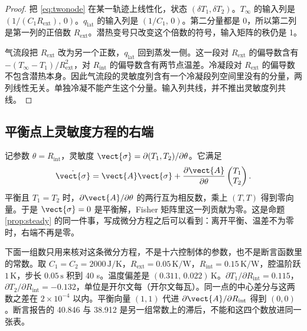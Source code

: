 \begin{proof}
把 \eqref{eq:twonode} 在某一轨迹上线性化，状态 \((\delta T_1,\delta T_2)\)。\(T_\infty\) 的输入列是 \((1/(C_1 R_{\mathrm{ext}}),\,0)\)。\(q_{\mathrm{lat}}\) 的输入列是 \((1/C_1,\,0)\)。第二分量都是 0，所以第二列是第一列的正倍数 \(R_{\mathrm{ext}}\)。潜热变号只改变这个倍数的符号，输入矩阵的秩仍是 1。

气流段把 \(R_{\mathrm{ext}}\) 改为另一个正数，\(q_{\mathrm{lat}}\) 回到蒸发一侧。这一段对 \(R_{\mathrm{ext}}\) 的偏导数含有 \(-(T_\infty-T_1)/R_{\mathrm{ext}}^2\)，对 \(R_{\mathrm{int}}\) 的偏导数含有两节点温差。冷凝段对 \(R_{\mathrm{ext}}\) 的偏导数不包含潜热本身。因此气流段的灵敏度列含有一个冷凝段列空间里没有的分量，两列线性无关。单独冷凝不能产生这个分量。输入列共线，并不推出灵敏度列共线。
\end{proof}

\subsection{平衡点上灵敏度方程的右端}

记参数 \(\theta=R_{\mathrm{int}}\)，灵敏度 \(\vect{\sigma}=\partial(T_1,T_2)/\partial\theta\)。它满足
\begin{equation}
\label{eq:sigma}
\dot{\vect{\sigma}}=\vect{A}\vect{\sigma}+\frac{\partial\vect{A}}{\partial\theta}\begin{pmatrix}T_1\\ T_2\end{pmatrix}.
\end{equation}
平衡且 \(T_1=T_2\) 时，\(\partial\vect{A}/\partial\theta\) 的两行互为相反数，乘上 \((T,T)\) 得到零向量。于是 \(\vect{\sigma}=0\) 是平衡解，Fisher 矩阵里这一列贡献为零。这是命题 \ref{prop:steady} 的同一件事，写成微分方程之后可以看到：离开平衡、温差不为零时，右端不再是零。

下面一组数只用来核对这条微分方程，不是十六控制体的参数，也不是断言函数里的常数。取 \(C_1=C_2=2000\,\mathrm{J/K}\)，\(R_{\mathrm{ext}}=0.05\,\mathrm{K/W}\)，\(R_{\mathrm{int}}=0.15\,\mathrm{K/W}\)，腔温阶跃 \(1\,\mathrm{K}\)，步长 \(0.05\,\mathrm{s}\) 积到 40 s。温度偏差是 \((0.311,\,0.022)\,\mathrm{K}\)。\(\partial T_1/\partial R_{\mathrm{int}}=0.115\)，\(\partial T_2/\partial R_{\mathrm{int}}=-0.132\)，单位是开尔文每（开尔文每瓦）。同一点的中心差分与这两数之差在 \(2\times 10^{-4}\) 以内。平衡向量 \((1,1)\) 代进 \(\partial\vect{A}/\partial R_{\mathrm{int}}\) 得到 \((0,0)\)。断言报告的 40.846 与 38.912 是另一组常数上的滞后，不能和这四个数放进同一张表。

